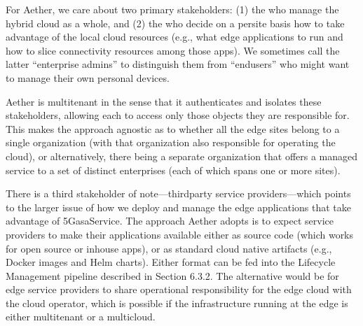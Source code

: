 \documentclass[a4paper,11pt,english]{sphinxmanual}
\begin{document}
\sphinxAtStartPar
For Aether, we care about two primary stakeholders: (1) the  who manage the hybrid cloud as a whole, and (2) the
 who decide on a per\sphinxhyphen{}site basis how to take
advantage of the local cloud resources (e.g., what edge applications
to run and how to slice connectivity resources among those apps). We
sometimes call the latter “enterprise admins” to distinguish them from
“end\sphinxhyphen{}users” who might want to manage their own personal devices.

\sphinxAtStartPar
Aether is multi\sphinxhyphen{}tenant in the sense that it authenticates and isolates
these stakeholders, allowing each to access only those objects they
are responsible for. This makes the approach agnostic as to whether
all the edge sites belong to a single organization (with that
organization also responsible for operating the cloud), or
alternatively, there being a separate organization that offers a
managed service to a set of distinct enterprises (each of which spans
one or more sites).

\sphinxAtStartPar
There is a third stakeholder of note—third\sphinxhyphen{}party service
providers—which points to the larger issue of how we deploy and manage
the edge applications that take advantage of 5G\sphinxhyphen{}as\sphinxhyphen{}a\sphinxhyphen{}Service. The
approach Aether adopts is to expect service providers to make their
applications available either as source code (which works for open
source or in\sphinxhyphen{}house apps), or as standard cloud native artifacts (e.g.,
Docker images and Helm charts). Either format can be fed into the
Lifecycle Management pipeline described in Section 6.3.2. The
alternative would be for edge service providers to share operational
responsibility for the edge cloud with the cloud operator, which is
possible if the infrastructure running at the edge is either
multi\sphinxhyphen{}tenant or a multi\sphinxhyphen{}cloud.
\end{document}
